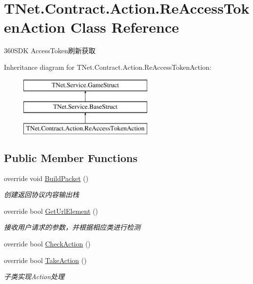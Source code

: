 \hypertarget{class_t_net_1_1_contract_1_1_action_1_1_re_access_token_action}{}\section{T\+Net.\+Contract.\+Action.\+Re\+Access\+Token\+Action Class Reference}
\label{class_t_net_1_1_contract_1_1_action_1_1_re_access_token_action}


360\+S\+DK Access\+Token刷新获取  


Inheritance diagram for T\+Net.\+Contract.\+Action.\+Re\+Access\+Token\+Action\+:\begin{figure}[H]
\begin{center}
\leavevmode
\includegraphics[height=3.000000cm]{class_t_net_1_1_contract_1_1_action_1_1_re_access_token_action}
\end{center}
\end{figure}
\subsection*{Public Member Functions}
\begin{DoxyCompactItemize}
\item 
override void \mbox{\hyperlink{class_t_net_1_1_contract_1_1_action_1_1_re_access_token_action_a722f628b8496ce0561bc0f190657d46f}{Build\+Packet}} ()
\begin{DoxyCompactList}\small\item\em 创建返回协议内容输出栈 \end{DoxyCompactList}\item 
override bool \mbox{\hyperlink{class_t_net_1_1_contract_1_1_action_1_1_re_access_token_action_a7dd58986375658c072e563479d8ae29a}{Get\+Url\+Element}} ()
\begin{DoxyCompactList}\small\item\em 接收用户请求的参数，并根据相应类进行检测 \end{DoxyCompactList}\item 
override bool \mbox{\hyperlink{class_t_net_1_1_contract_1_1_action_1_1_re_access_token_action_a7822fac32c456f1ac8cf613c5982cc30}{Check\+Action}} ()
\item 
override bool \mbox{\hyperlink{class_t_net_1_1_contract_1_1_action_1_1_re_access_token_action_a43205d0d7be766ffd79fef9d8b6730d5}{Take\+Action}} ()
\begin{DoxyCompactList}\small\item\em 子类实现\+Action处理 \end{DoxyCompactList}\end{DoxyCompactItemize}
